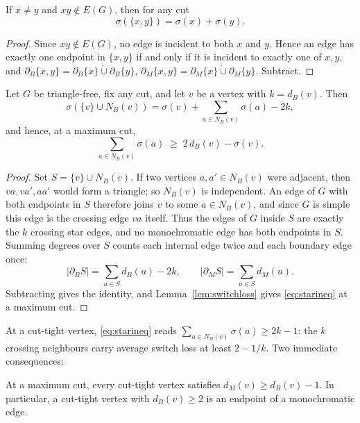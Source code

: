 \begin{lemma}\label{lem:nonedgeadd}
If \(x\ne y\) and \(xy\notin E(G)\), then for any cut
\[
 \sigma(\{x,y\})=\sigma(x)+\sigma(y).
\]
\end{lemma}

\begin{proof}
Since \(xy\notin E(G)\), no edge is incident to both \(x\) and \(y\).
Hence an edge has exactly one endpoint in \(\{x,y\}\) if and only if it
is incident to exactly one of \(x,y\), and
\(\partial_B\{x,y\}=\partial_B\{x\}\mathbin{\dot\cup}\partial_B\{y\}\),
\(\partial_M\{x,y\}=\partial_M\{x\}\mathbin{\dot\cup}\partial_M\{y\}\).
Subtract.
\end{proof}

\begin{lemma}\label{lem:starineq}
Let \(G\) be triangle-free, fix any cut, and let \(v\) be a vertex with
\(k=d_B(v)\). Then
\[
 \sigma(\{v\}\cup N_B(v))
  =\sigma(v)+\sum_{a\in N_B(v)}\sigma(a)-2k,
\]
and hence, at a maximum cut,
\begin{equation}\label{eq:starineq}
 \sum_{a\in N_B(v)}\sigma(a)\;\ge\;2\,d_B(v)-\sigma(v).
\end{equation}
\end{lemma}

\begin{proof}
Set \(S=\{v\}\cup N_B(v)\). If two vertices \(a,a'\in N_B(v)\) were
adjacent, then \(va,va',aa'\) would form a triangle; so \(N_B(v)\) is
independent. An edge of \(G\) with both endpoints in \(S\) therefore
joins \(v\) to some \(a\in N_B(v)\), and since \(G\) is simple this
edge is the crossing edge \(va\) itself. Thus the edges of \(G\) inside
\(S\) are exactly the \(k\) crossing star edges, and no monochromatic
edge has both endpoints in \(S\). Summing degrees over \(S\) counts
each internal edge twice and each boundary edge once:
\[
 |\partial_BS|=\sum_{u\in S}d_B(u)-2k,
 \qquad
 |\partial_MS|=\sum_{u\in S}d_M(u).
\]
Subtracting gives the identity, and Lemma~\ref{lem:switchloss} gives
\eqref{eq:starineq} at a maximum cut.
\end{proof}

At a cut-tight vertex, \eqref{eq:starineq} reads
\(\sum_{a\in N_B(v)}\sigma(a)\ge2k-1\): the \(k\) crossing neighbours
carry average switch loss at least \(2-1/k\). Two immediate
consequences:

\begin{corollary}\label{cor:badendpoint}
At a maximum cut, every cut-tight vertex satisfies
\(d_M(v)\ge d_B(v)-1\). In particular, a cut-tight vertex with
\(d_B(v)\ge2\) is an endpoint of a monochromatic edge.
\end{corollary}

